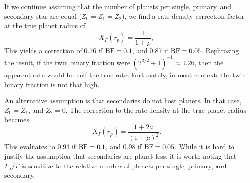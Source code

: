 If we continue assuming that the number of planets per single, primary, and 
secondary star are equal ($Z_0=Z_1=Z_2$), we find a rate density correction 
factor at the true planet radius of
\begin{equation}
X_\Gamma(r_p) = \frac{1}{1+\mu},
\label{eq:Z_eq_model_1_correction}
\end{equation}
This yields a correction of 0.76 if ${\rm BF}=0.1$, and 0.87 if ${\rm 
BF}=0.05$.
Rephrasing the result, if the twin binary fraction were 
$(2^{3/2}+1)^{-1}\approx 0.26$, then the apparent rate would be half the true 
rate.
Fortunately, in most contexts the twin binary fraction is not that high.

An alternative assumption is that secondaries do not host planets. In that 
case, $Z_0=Z_1$, and $Z_2=0$. The correction to the rate density at the true 
planet radius becomes
\begin{equation}
X_\Gamma(r_p) = \frac{1+2\mu}{(1+\mu)^2}.
\end{equation}
This evaluates to 0.94 if ${\rm BF}=0.1$, and 0.98 if ${\rm BF}=0.05$.
While it is hard to justify the assumption that secondaries are planet-less, 
it is worth noting that $\Gamma_a/\Gamma$ is sensitive to the relative number 
of planets per single, primary, and secondary.
